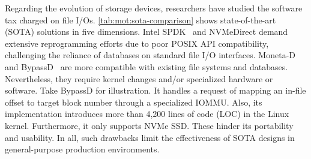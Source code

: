 Regarding the  evolution of storage devices,
researchers have studied the  software tax charged on file I/Os.
\autoref{tab:mot:sota-comparison} shows   state-of-the-art (SOTA) solutions in five dimensions. Intel
SPDK~\cite{SSD:SPDK:CloudCom-2017} and NVMeDirect  \cite{SSD:NVMeDirect:HotStorage-2016}  demand 
extensive reprogramming efforts  due to poor POSIX API compatibility, challenging the reliance of databases on standard file I/O interfaces.
Moneta-D \cite{SSD:Moneta-D:ASPLOS-2012} and BypassD~\cite{SSD:BypassD:ASPLOS-2024} are more compatible
with existing file systems and   databases. Nevertheless, they  require kernel changes and/or specialized hardware or 
software.
Take BypassD for illustration. It handles a request of mapping an in-file offset to  target block number through
a specialized IOMMU. Also, its implementation introduces more than 4,200 lines of code (LOC) in the Linux kernel.
  Furthermore, it only supports NVMe SSD.
 These
hinder its portability and usability. 
In all,
such drawbacks   limit the effectiveness of SOTA designs in general-purpose  production environments.

